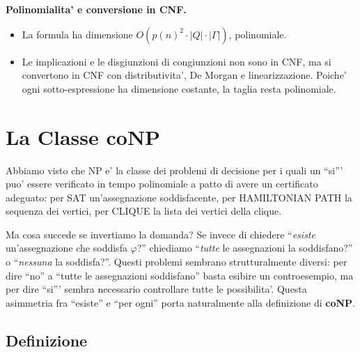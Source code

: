 {  \textbf{Polinomialita' e conversione in CNF.}
  \begin{itemize}
    \item La formula ha dimensione $O(p(n)^2 \cdot |Q| \cdot |\Gamma|)$, polinomiale.
    \item Le implicazioni e le disgiunzioni di congiunzioni non sono in CNF, ma si convertono in CNF con distributivita', De Morgan e linearizzazione. Poiche' ogni sotto-espressione ha dimensione costante, la taglia resta polinomiale.
  \end{itemize}
}


\section{La Classe coNP}

Abbiamo visto che NP e' la classe dei problemi di decisione per i quali un ``si''' puo' essere verificato in tempo polinomiale a patto di avere un certificato adeguato: per SAT un'assegnazione soddisfacente, per HAMILTONIAN PATH la sequenza dei vertici, per CLIQUE la lista dei vertici della clique.

Ma cosa succede se invertiamo la domanda? Se invece di chiedere ``\textit{esiste} un'assegnazione che soddisfa $\varphi$?'' chiediamo ``\textit{tutte} le assegnazioni la soddisfano?'' o ``\textit{nessuna} la soddisfa?''. Questi problemi sembrano strutturalmente diversi: per dire ``no'' a ``tutte le assegnazioni soddisfano'' basta esibire un controesempio, ma per dire ``si''' sembra necessario controllare tutte le possibilita'. Questa asimmetria fra ``esiste'' e ``per ogni'' porta naturalmente alla definizione di \textbf{coNP}.

\subsection{Definizione}


